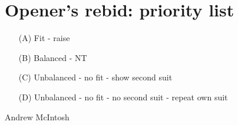 \documentclass[14pt]{extarticle}
\begin{document}
\newpage
\vspace*{\fill}
\begingroup
\centering
\section*{Opener's rebid: priority list}
\endgroup
\begin{itemize}
\item[(A)] Fit - raise
\item[(B)] Balanced - NT
\item[(C)] Unbalanced - no fit - show second suit
\item[(D)] Unbalanced - no fit - no second suit - repeat own suit
\end{itemize}


\vspace*{\fill}
\begin{flushbottom}
 \begin{center}
 \tiny
 \textcopyright Andrew McIntosh
\end{center}
\end{flushbottom}
\end{document}
